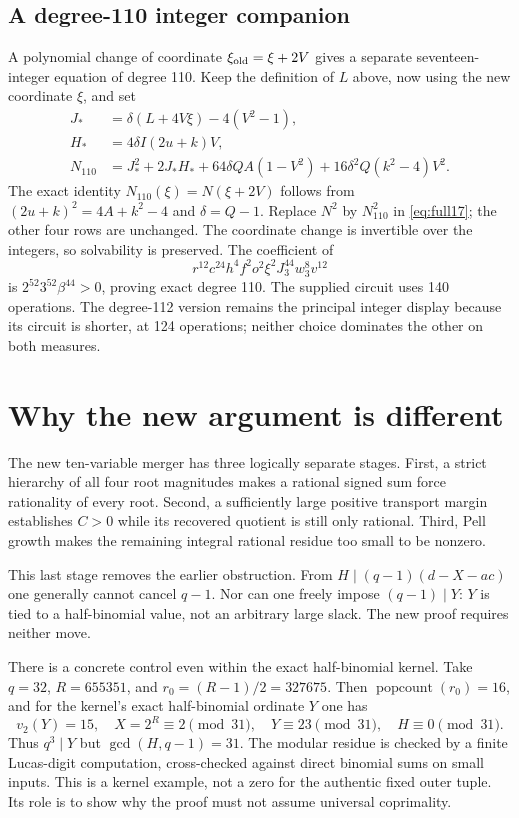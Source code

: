 \documentclass[11pt]{article}
\theoremstyle{remark}
\begin{document}
\subsection{A degree-110 integer companion}
A polynomial change of coordinate $\xi_{\rm old}=\xi+2V$ gives a separate
seventeen-integer equation of degree 110. Keep the definition of $L$ above,
now using the new coordinate $\xi$, and set
\begin{align*}
 J_*&=\delta(L+4V\xi)-4(V^2-1),\\
 H_*&=4\delta I(2u+k)V,\\
 N_{110}&=J_*^2+2J_*H_*+64\delta QA(1-V^2)
                  +16\delta^2Q(k^2-4)V^2.
\end{align*}
The exact identity $N_{110}(\xi)=N(\xi+2V)$ follows from
$(2u+k)^2=4A+k^2-4$ and $\delta=Q-1$. Replace $N^2$ by $N_{110}^2$
in \eqref{eq:full17}; the other four rows are unchanged. The coordinate
change is invertible over the integers, so solvability is preserved.
The coefficient of
\[
 r^{12}c^{24}h^4 f^2o^2\xi^2J_3^{44}w_3^8v^{12}
\]
is $2^{52}3^{52}\beta^{44}>0$, proving exact degree 110.
The supplied circuit uses 140 operations. The degree-112 version remains
the principal integer display because its circuit is shorter, at 124
operations; neither choice dominates the other on both measures.

\section{Why the new argument is different}

The new ten-variable merger has three logically separate stages.
First, a strict hierarchy of all four root magnitudes makes a rational
signed sum force rationality of every root. Second, a sufficiently large
positive transport margin establishes $C>0$ while its recovered quotient
is still only rational. Third, Pell growth makes the remaining integral
rational residue too small to be nonzero.

This last stage removes the earlier obstruction. From
$H\mid(q-1)(d-X-ac)$ one generally cannot cancel $q-1$. Nor can
one freely impose $(q-1)\mid Y$: $Y$ is tied to a half-binomial value,
not an arbitrary large slack. The new proof requires neither move.

There is a concrete control even within the exact half-binomial kernel.
Take $q=32$, $R=655351$, and $r_0=(R-1)/2=327675$. Then
$\operatorname{popcount}(r_0)=16$, and for the kernel's exact half-binomial
ordinate $Y$ one has
\[
 v_2(Y)=15,\quad X=2^R\equiv2\pmod{31},\quad
 Y\equiv23\pmod{31},\quad H\equiv0\pmod{31}.
\]
Thus $q^3\mid Y$ but $\gcd(H,q-1)=31$. The modular residue is checked
by a finite Lucas-digit computation, cross-checked against direct
binomial sums on small inputs. This is a kernel example, not a zero for
the authentic fixed outer tuple. Its role is to show why the proof must
not assume universal coprimality.
\end{document}

